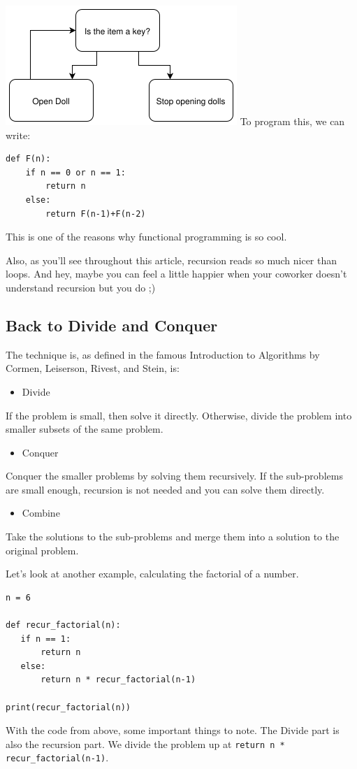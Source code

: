 \documentclass{article}
\newcommand{\code}[1]{\texttt{#1}}
\begin{document}
\includegraphics[width=\textwidth,height=\textheight,keepaspectratio]{f.png}
To program this, we can write:
\begin{verbatim}
def F(n):
	if n == 0 or n == 1:
		return n
  	else:
		return F(n-1)+F(n-2)
\end{verbatim}
This is one of the reasons why functional programming is so cool.

Also, as you'll see throughout this article, recursion reads so much nicer than loops. And hey, maybe you can feel a little happier when your coworker doesn't understand recursion but you do ;) 
\newpage
\subsection{Back to Divide and Conquer}
The technique is, as defined in the famous Introduction to Algorithms by Cormen, Leiserson, Rivest, and Stein, is:
\begin{itemize}
    \item Divide
\end{itemize}
If the problem is small, then solve it directly. Otherwise, divide the problem into smaller subsets of the same problem.
\begin{itemize}
    \item Conquer
\end{itemize}
Conquer the smaller problems by solving them recursively. If the sub-problems are small enough, recursion is not needed and you can solve them directly.
\begin{itemize}
    \item Combine
\end{itemize}
Take the solutions to the sub-problems and merge them into a solution to the original problem.

Let's look at another example, calculating the factorial of a number.
\begin{verbatim}
n = 6

def recur_factorial(n):
   if n == 1:
       return n
   else:
       return n * recur_factorial(n-1)

print(recur_factorial(n))
\end{verbatim}
With the code from above, some important things to note. The Divide part is also the recursion part. We divide the problem up at \code{return n * recur\_factorial(n-1)}.
\end{document}
